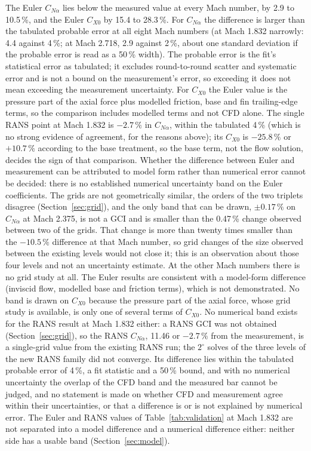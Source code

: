 \documentclass[11pt,a4paper]{article}
\newcommand{\CNa}{C_{N\alpha}}
\newcommand{\CXzero}{C_{X0}}
\begin{document}
The Euler $\CNa$ lies below the measured value at every Mach number, by 2.9 to 10.5\,\%, and the Euler $\CXzero$ by 15.4 to 28.3\,\%.
For $\CNa$ the difference is larger than the tabulated probable error at all eight Mach numbers (at Mach 1.832 narrowly: 4.4 against 4\,\%; at Mach 2.718, 2.9 against 2\,\%, about one standard deviation if the probable error is read as a 50\,\% width).
The probable error is the fit's statistical error as tabulated; it excludes round-to-round scatter and systematic error and is not a bound on the measurement's error,
so exceeding it does not mean exceeding the measurement uncertainty.
For $\CXzero$ the Euler value is the pressure part of the axial force plus modelled friction, base and fin trailing-edge terms, so the comparison
includes modelled terms and not CFD alone.
The single RANS point at Mach 1.832 is $-2.7\,\%$ in $\CNa$, within the tabulated 4\,\% (which is no strong evidence of agreement, for the reasons above); its $\CXzero$ is $-25.8\,\%$ or $+10.7\,\%$ according to
the base treatment, so the base term, not the flow solution, decides the sign of that comparison.
Whether the difference between Euler and measurement can be attributed to model form rather than numerical error
cannot be decided: there is no established numerical uncertainty band on the Euler coefficients.
The grids are not geometrically similar, the orders of the two triplets disagree (Section~\ref{sec:grid}),
and the only band that can be drawn, $\pm0.17\,\%$ on $\CNa$ at Mach 2.375, is not a GCI and is smaller than the
0.47\,\% change observed between two of the grids.
That change is more than twenty times smaller than the $-10.5\,\%$ difference at that Mach number, so grid changes of the size observed
between the existing levels would not close it; this is an observation about those four levels and not an uncertainty estimate.
At the other Mach numbers there is no grid study at all.
The Euler results are consistent with a model-form difference (inviscid flow, modelled base and friction terms), which is not demonstrated.
No band is drawn on $\CXzero$ because the pressure part of the axial force, whose grid study is available, is only one
of several terms of $\CXzero$.
No numerical band exists for the RANS result at Mach 1.832 either: a RANS GCI was not obtained (Section~\ref{sec:grid}), so the RANS $\CNa$, 11.46 or $-2.7\,\%$ from the measurement, is a single-grid value from the existing RANS run; the $2^\circ$ solves of the three levels of the new RANS family did not converge.
Its difference lies within the tabulated probable error of 4\,\%, a fit statistic and a 50\,\% bound, and with no numerical uncertainty the overlap of the CFD band and the measured bar cannot be judged,
and no statement is made on whether CFD and measurement agree within their uncertainties, or that a difference is or is not explained by numerical error.
The Euler and RANS values of Table~\ref{tab:validation} at Mach 1.832 are not separated into a model difference and a numerical difference either: neither side has a usable band (Section~\ref{sec:model}).
\end{document}
